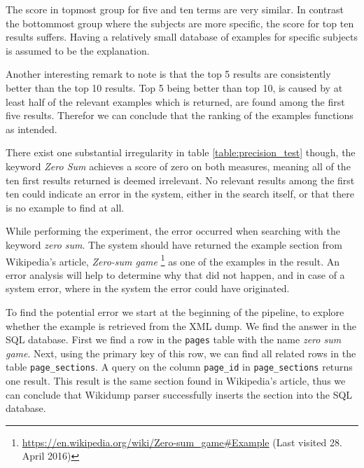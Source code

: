 The score in topmost group for five and ten terms are very similar. In contrast the bottommost group where the subjects are more specific, the score for top ten results suffers. Having a relatively small database of examples for specific subjects is assumed to be the explanation.

Another interesting remark to note is that the top 5 results are consistently better than the top 10 results. Top 5 being better than top 10, is caused by at least half of the relevant examples which is returned, are found among the first five results. Therefor we can conclude that the ranking of the examples functions as intended. 

There exist one substantial irregularity in table \ref{table:precision_test} though, the keyword \textit{Zero Sum} achieves a score of zero on both measures, meaning all of the ten first results returned is deemed irrelevant. No relevant results among the first ten could indicate an error in the system, either in the search itself, or that there is no example to find at all. 

While performing the experiment, the error occurred when searching with the keyword \textit{zero sum}. The system should have returned the example section from Wikipedia's article, \textit{Zero-sum game} \footnote{\url{https://en.wikipedia.org/wiki/Zero-sum\_game\#Example} (Last visited 28. April 2016)} as one of the examples in the result. An error analysis will help to determine why that did not happen, and in case of a system error, where in the system the error could have originated. 

To find the potential error we start at the beginning of the pipeline, to explore whether the example is retrieved from the XML dump. We find the answer in the SQL database. First we find a row in the \texttt{pages} table with the name \textit{zero sum game}. Next, using the primary key of this row, we can find all related rows in the table \texttt{page\_sections}. A query on the column \texttt{page\_id} in \texttt{page\_sections} returns one result. This result is the same section found in Wikipedia's article, thus we can conclude that Wikidump parser successfully inserts the section into the SQL database.

